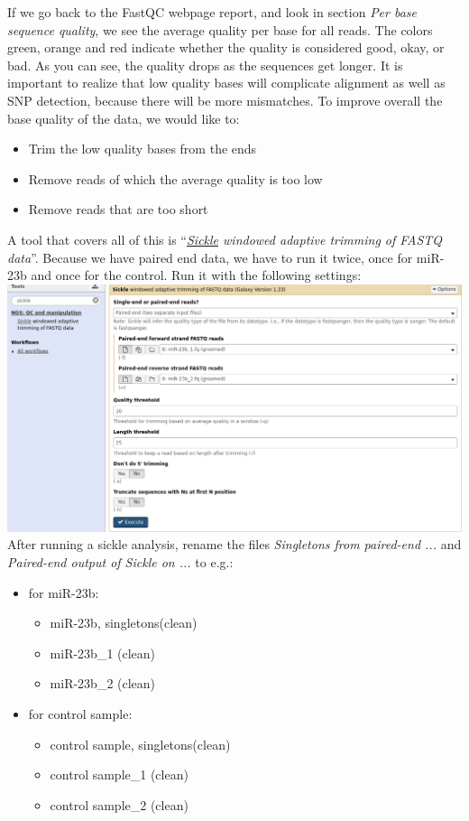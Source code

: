 If we go back to the FastQC webpage report, and look in section \textit{Per base sequence quality}, we see the average quality per base for all reads. The colors green, orange and red indicate whether the quality is considered good, okay, or bad. As you can see, the quality drops as the sequences get longer. It is important to realize that low quality bases will complicate alignment as well as SNP detection, because there will be more mismatches. To improve overall the base quality of the data, we would like to:
\begin{itemize}
	\item Trim the low quality bases from the ends
	\item Remove reads of which the average quality is too low
	\item Remove reads that are too short
\end{itemize}
A tool that covers all of this is ``\textit{\underline{Sickle} windowed adaptive trimming of FASTQ data}''. Because we have paired end data, we have to run it twice, once for miR-23b and once for the control. Run it with the following settings:\\
\includegraphics[width=\textwidth]{figures/qc_06.png}\\
After running a sickle analysis, rename the files 
\textit{Singletons from paired-end ...} and \textit{Paired-end output of Sickle on ...} to e.g.:
\begin{itemize}
	\item[] for miR-23b:
	\begin{itemize}
		\item miR-23b, singletons(clean)
		\item miR-23b\_1 (clean)
		\item miR-23b\_2 (clean)
	\end{itemize}
	\item[] for control sample:
	\begin{itemize}
		\item control sample, singletons(clean)
		\item control sample\_1 (clean)
		\item control sample\_2 (clean)
	\end{itemize}
\end{itemize}
